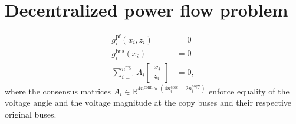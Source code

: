 \documentclass{article}
\newcommand{\nregions}{n^{\text{reg}}}
\newcommand{\nconnections}{n^{\text{conn}}}
\newcommand{\ncore}{n^\text{core}}
\newcommand{\ncopy}{n^\text{copy}}
\newcommand{\stateCore}{x}
\newcommand{\stateCopy}{z}
\newcommand{\pf}{g^{\text{pf}}}
\newcommand{\busspecs}{g^{\text{bus}}}
\begin{document}
\section{Decentralized power flow problem}

\begin{subequations}
    \begin{align}
        \pf_i( \stateCore_i, \stateCopy_i ) &= 0 \\
        \busspecs_i ( \stateCore_i ) &= 0 \\
        \sum_{i = 1}^{\nregions} A_i \begin{bmatrix}
            \stateCore_i \\
            \stateCopy_i
        \end{bmatrix}
        &= 0,
    \end{align}
\end{subequations}
where the consensus matrices $A_i \in \mathbb{R}^{4 \nconnections \times (4 \ncore_i + 2 \ncopy_i)}$ enforce equality of the voltage angle and the voltage magnitude at the copy buses and their respective original buses.
\end{document}
